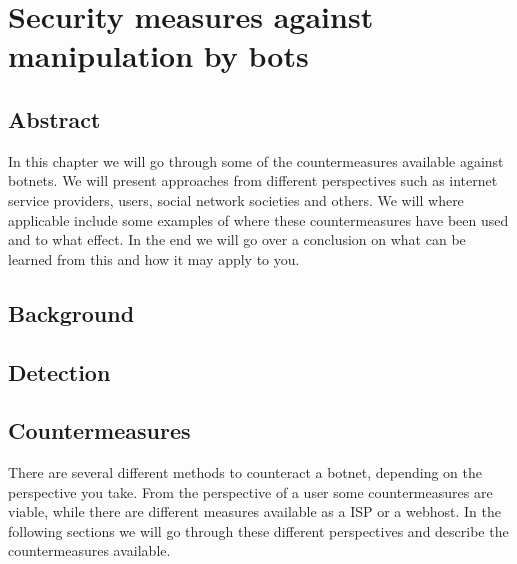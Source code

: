 \chapter{Security measures against manipulation by bots}


\section{Abstract}
In this chapter we will go through some of the countermeasures available against botnets.
We will present approaches from different perspectives such as internet service providers, users, social network societies and others. We will where applicable include some examples of where these countermeasures have been used and to what effect.
In the end we will go over a conclusion on what can be learned from this and how it may apply to you.



\section{Background}




\section{Detection}




\section{Countermeasures}
There are several different methods to counteract a botnet, depending on the perspective you take.
From the perspective of a user some countermeasures are viable, while there are different measures available as a ISP or a webhost.
In the following sections we will go through these different perspectives and describe the countermeasures available.

